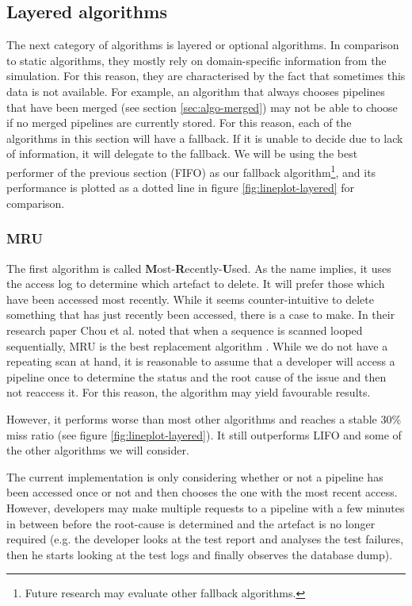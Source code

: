 \subsection{Layered algorithms}\label{sec:layered}
    The next category of algorithms is layered or optional algorithms. In comparison to static algorithms, they mostly rely on domain-specific information from the simulation. For this reason, they are characterised by the fact that sometimes this data is not available. For example, an algorithm that always chooses pipelines that have been merged (see section \ref{sec:algo-merged}) may not be able to choose if no merged pipelines are currently stored. For this reason, each of the algorithms in this section will have a fallback. If it is unable to decide due to lack of information, it will delegate to the fallback. We will be using the best performer of the previous section (FIFO) as our fallback algorithm\footnote{Future research may evaluate other fallback algorithms.}, and its performance is plotted as a dotted line in figure \ref{fig:lineplot-layered} for comparison.
    
    \subsubsection{MRU}
        The first algorithm is called \textbf{M}ost-\textbf{R}ecently-\textbf{U}sed. As the name implies, it uses the access log to determine which artefact to delete. It will prefer those which have been accessed most recently. While it seems counter-intuitive to delete something that has just recently been accessed, there is a case to make. In their research paper Chou et al. noted that when a sequence is scanned looped sequentially, MRU is the best replacement algorithm \cite{mru-reasoning}. While we do not have a repeating scan at hand, it is reasonable to assume that a developer will access a pipeline once to determine the status and the root cause of the issue and then not reaccess it. For this reason, the algorithm may yield favourable results.
        
        However, it performs worse than most other algorithms and reaches a stable 30\% miss ratio (see figure \ref{fig:lineplot-layered}). It still outperforms LIFO and some of the other algorithms we will consider.
        
        The current implementation is only considering whether or not a pipeline has been accessed once or not and then chooses the one with the most recent access. However, developers may make multiple requests to a pipeline with a few minutes in between before the root-cause is determined and the artefact is no longer required (e.g. the developer looks at the test report and analyses the test failures, then he starts looking at the test logs and finally observes the database dump).
        
